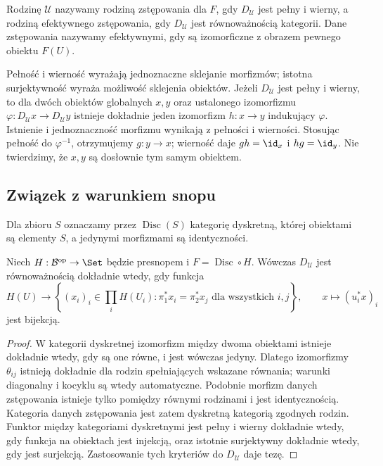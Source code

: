 \begin{definicja}\label{cat:def:effective-descent}
Rodzinę $\mathcal U$ nazywamy rodziną zstępowania dla $F$, gdy $D_{\mathcal U}$ jest pełny i wierny, a rodziną efektywnego zstępowania, gdy $D_{\mathcal U}$ jest równoważnością kategorii. Dane zstępowania nazywamy efektywnymi, gdy są izomorficzne z obrazem pewnego obiektu $F(U)$.
\end{definicja}

Pełność i wierność wyrażają jednoznaczne sklejanie morfizmów; istotna surjektywność wyraża możliwość sklejenia obiektów. Jeżeli $D_{\mathcal U}$ jest pełny i wierny, to dla dwóch obiektów globalnych $x,y$ oraz ustalonego izomorfizmu $\varphi:D_{\mathcal U}x\to D_{\mathcal U}y$ istnieje dokładnie jeden izomorfizm $h:x\to y$ indukujący $\varphi$. Istnienie i jednoznaczność morfizmu wynikają z pełności i wierności. Stosując pełność do $\varphi^{-1}$, otrzymujemy $g:y\to x$; wierność daje $gh=\id_x$ i $hg=\id_y$. Nie twierdzimy, że $x,y$ są dosłownie tym samym obiektem.

\subsection{Związek z warunkiem snopu}

Dla zbioru $S$ oznaczamy przez $\operatorname{Disc}(S)$ kategorię dyskretną, której obiektami są elementy $S$, a jedynymi morfizmami są identyczności.

\begin{stwierdzenie}\label{cat:prop:descent-discrete-sheaf}
Niech $H:\mathcal B^{\mathrm{op}}\to\Set$ będzie presnopem i $F=\operatorname{Disc}\circ H$. Wówczas $D_{\mathcal U}$ jest równoważnością dokładnie wtedy, gdy funkcja
\[
 H(U)\longrightarrow
 \left\{(x_i)_i\in\prod_i H(U_i):
            \pi_1^*x_i=\pi_2^*x_j\text{ dla wszystkich }i,j\right\},
 \qquad x\longmapsto(u_i^*x)_i
\]
jest bijekcją.
\end{stwierdzenie}
\begin{proof}
W kategorii dyskretnej izomorfizm między dwoma obiektami istnieje dokładnie wtedy, gdy są one równe, i jest wówczas jedyny. Dlatego izomorfizmy $\theta_{ij}$ istnieją dokładnie dla rodzin spełniających wskazane równania; warunki diagonalny i kocyklu są wtedy automatyczne. Podobnie morfizm danych zstępowania istnieje tylko pomiędzy równymi rodzinami i jest identycznością. Kategoria danych zstępowania jest zatem dyskretną kategorią zgodnych rodzin. Funktor między kategoriami dyskretnymi jest pełny i wierny dokładnie wtedy, gdy funkcja na obiektach jest injekcją, oraz istotnie surjektywny dokładnie wtedy, gdy jest surjekcją. Zastosowanie tych kryteriów do $D_{\mathcal U}$ daje tezę.
\end{proof}

